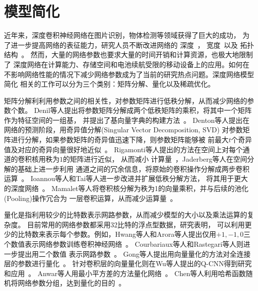\section{模型简化}
近年来，深度卷积神经网络在图片识别，物体检测等领域获得了巨大的成功，
为了进一步提高网络的表征能力，研究人员不断改进网络的
深度~\cite{simonyan2014very}，
宽度~\cite{zagoruyko2016wide}以及
拓扑结构~\cite{szegedy2015going,srivastava2015highway,he2016deep}。
然而，大量的网络参数也要求大量的时间开销和计算资源，也极大地限制了
深度网络在计算能力、存储空间和电池续航受限的移动设备上的应用。如何在
不影响网络性能的情况下减少网络参数成为了当前的研究热点问题。深度网络模型简化
相关的工作可以分为三个类别：矩阵分解、量化以及稀疏优化。

矩阵分解利利用参数之间的相关性，对参数矩阵进行低秩分解，从而减少网络的参数个数。
Denil等人提出将参数矩阵分解成两个低秩矩阵的乘积，将其中一个矩阵作为特征空间的一组基，
并提出了基向量字典的构建方法~\cite{denil2013predicting}。
Denton等人提出在网络的预测阶段，用奇异值分解(Singular Vector Decomposition, SVD)
对参数矩阵进行分解，如果参数矩阵的奇异值迅速下降，则参数矩阵能够被
前最大$t$个奇异值及对应的奇异向量很好地近似~\cite{denton2014exploiting}。
Rigamonti等人提出的方法在空间上对每个通道的卷积核用秩为$1$的矩阵进行近似， 从而减小
计算量~\cite{rigamonti2013learning}，Jaderberg等人在空间分解的基础上进一步利用
通道之间的冗余信息，将原始的卷积操作分解成两步卷积运算~\cite{jaderberg2014speeding}。
Ioannou等人和Tai等人进一步改进并扩展低秩分解方法，
将其用于更大的深度网络~\cite{ioannou2015training,tai2015convolutional}。
Mamalet等人将卷积核分解为秩为1的向量乘积，并与后续的池化(Pooling)操作冗合为
一层卷积运算，从而减少运算量~\cite{mamalet2012simplifying}。

量化是指利用较少的比特数表示网路参数，从而减少模型的大小以及乘法运算的复杂度。
目前常用的网络参数都采用32比特的浮点型数据，研究表明，
可以利用更少的比特数来表示每个参数。例如，Hwang等人和Arora等人提出仅用$+1, -1,
0$三个数值表示网络参数训练卷积神经网络~\cite{hwang2014fixed,arora2014provable}。
Courbariaux等人和Rastegari等人则进一步提出用二个数值
表示网路参数~\cite{courbariaux2015binaryconnect,rastegari2016xnor}。
Gong等人提出用向量量化的方法对全连接层的参数进行量化~\cite{gong2014compressing}。
针对卷积层的向量量化则在Wu等人提出的Q-CNN得到研究和应用~\cite{wu2016quantized}。
Anwar等人用最小平方差的方法量化网络~\cite{anwar2015fixed}。
Chen等人利用哈希函数随机将网络参数分组，达到量化的目的~\cite{chen2015compressing}。

